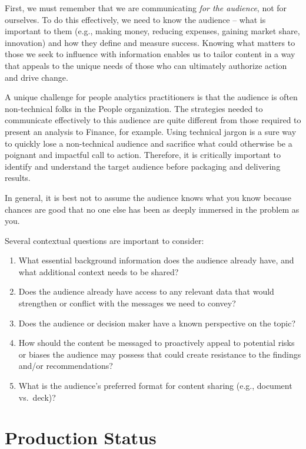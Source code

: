 \documentclass[
]{book}
\providecommand{\tightlist}{%
  \setlength{\itemsep}{0pt}\setlength{\parskip}{0pt}}
\begin{document}
First, we must remember that we are communicating \emph{for the audience}, not for ourselves. To do this effectively, we need to know the audience -- what is important to them (e.g., making money, reducing expenses, gaining market share, innovation) and how they define and measure success. Knowing what matters to those we seek to influence with information enables us to tailor content in a way that appeals to the unique needs of those who can ultimately authorize action and drive change.

A unique challenge for people analytics practitioners is that the audience is often non-technical folks in the People organization. The strategies needed to communicate effectively to this audience are quite different from those required to present an analysis to Finance, for example. Using technical jargon is a sure way to quickly lose a non-technical audience and sacrifice what could otherwise be a poignant and impactful call to action. Therefore, it is critically important to identify and understand the target audience before packaging and delivering results.

In general, it is best not to assume the audience knows what you know because chances are good that no one else has been as deeply immersed in the problem as you.

Several contextual questions are important to consider:

\begin{enumerate}
\def\labelenumi{\arabic{enumi}.}
\tightlist
\item
  What essential background information does the audience already have, and what additional context needs to be shared?
\item
  Does the audience already have access to any relevant data that would strengthen or conflict with the messages we need to convey?
\item
  Does the audience or decision maker have a known perspective on the topic?
\item
  How should the content be messaged to proactively appeal to potential risks or biases the audience may possess that could create resistance to the findings and/or recommendations?
\item
  What is the audience's preferred format for content sharing (e.g., document vs.~deck)?
\end{enumerate}

\hypertarget{production-status}{%
\section{Production Status}\label{production-status}}
\end{document}

